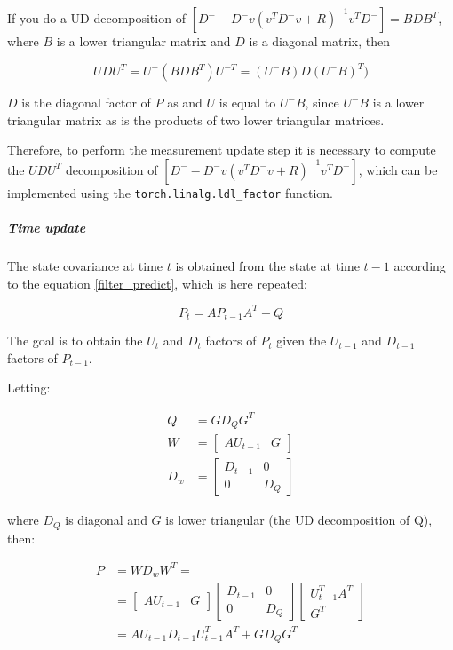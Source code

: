 \documentclass{article}
\begin{document}
If you do a UD decomposition of $\left[D^- - D^-v(v^TD^-v+R)^{-1}v^TD^- \right] = BDB^T$, where $B$ is a lower triangular matrix and $D$ is a diagonal matrix, then 

\[ UDU^T = U^-(BDB^T)U^{-T} = (U^-B)D(U^-B)^{T}) \]

$D$ is the diagonal factor of $P$ as and $U$ is equal to $U^-B$, since $U^-B$ is a lower triangular matrix as is the products of two lower triangular matrices.

Therefore, to perform the measurement update step it is necessary to compute the $UDU^T$ decomposition of $\left[D^- - D^-v(v^TD^-v+R)^{-1}v^TD^- \right]$, which can be implemented using the \verb|torch.linalg.ldl_factor| function.

\subparagraph{Time update}

The state covariance at time $t$ is obtained from the state at time $t-1$ according to the equation \ref{filter_predict}, which is here repeated:

$$ P_t = AP_{t-1}A^T + Q$$

The goal is to obtain the $U_t$ and $D_t$ factors of $P_t$ given the $U_{t-1}$ and $D_{t-1}$ factors of $P_{t-1}$.

Letting:

\begin{align}
    Q &= GD_QG^T\\
    W &= \begin{bmatrix}AU_{t-1}&G\end{bmatrix}\\
    D_w &= \begin{bmatrix}D_{t-1} & 0 \\ 0& D_Q \end{bmatrix}
\end{align}

where $D_Q$ is diagonal and $G$ is lower triangular (the UD decomposition of Q), then:

\begin{equation}
\begin{split}
   P &= WD_wW^T = \\
&=\begin{bmatrix}AU_{t-1}&G\end{bmatrix}\begin{bmatrix}D_{t-1} & 0 \\ 0& D_Q \end{bmatrix}\begin{bmatrix}U^T_{t-1}A^T\\G^T\end{bmatrix} \\
&= AU_{t-1}D_{t-1}U^T_{t-1}A^T + GD_QG^T  
\end{split}
\end{equation}
\end{document}
